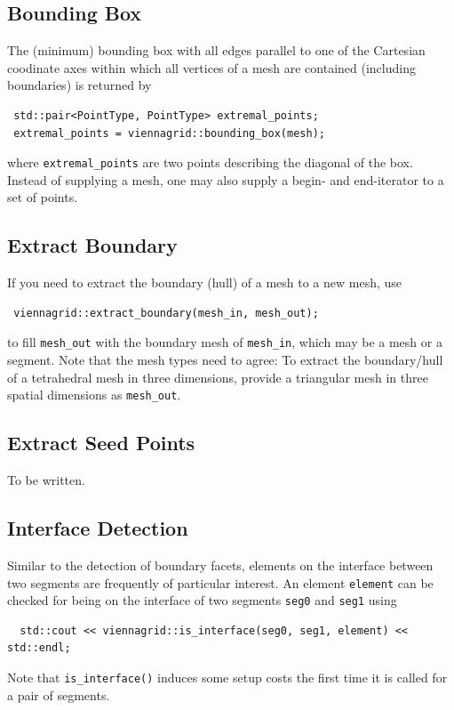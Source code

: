 
 \subsection{Bounding Box}
 The (minimum) bounding box with all edges parallel to one of the Cartesian coodinate axes within which all vertices of a mesh are contained (including boundaries) is returned by
 \begin{lstlisting}
 std::pair<PointType, PointType> extremal_points;
 extremal_points = viennagrid::bounding_box(mesh);
 \end{lstlisting}
 where \lstinline|extremal_points| are two points describing the diagonal of the box.
 Instead of supplying a mesh, one may also supply a begin- and end-iterator to a set of points.

 \subsection{Extract Boundary}
 If you need to extract the boundary (hull) of a mesh to a new mesh, use
 \begin{lstlisting}
 viennagrid::extract_boundary(mesh_in, mesh_out);
 \end{lstlisting}
 to fill \lstinline|mesh_out| with the boundary mesh of \lstinline|mesh_in|, which may be a mesh or a segment.
 Note that the mesh types need to agree: To extract the boundary/hull of a tetrahedral mesh in three dimensions, provide a triangular mesh in three spatial dimensions as \lstinline|mesh_out|. 

 \subsection{Extract Seed Points}
 To be written.

 \subsection{Interface Detection}
  Similar to the detection of boundary facets, elements on the interface between two segments are frequently of particular interest.
  An element \lstinline|element| can be checked for being on the interface of two segments \lstinline|seg0| and \lstinline|seg1| using
 \begin{lstlisting}
  std::cout << viennagrid::is_interface(seg0, seg1, element) << std::endl;
 \end{lstlisting}
 Note that \lstinline|is_interface()| induces some setup costs the first time it is called for a pair of segments.

